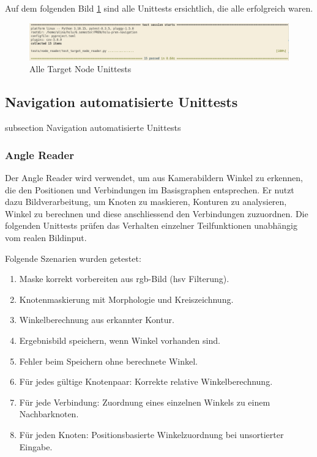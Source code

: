 \begin{table}[H]
\begin{tabularx}
  \hline
\end{tabularx}
\caption{Target Node Recognition Testprotokoll}
\label{table:target-node-test}
\end{table}



Auf dem folgenden Bild \ref{img:target_node_unittests} sind alle Unittests ersichtlich, die alle erfolgreich waren.

\begin{figure}[H]
\centering
\includegraphics[width=\textwidth]{assets/IT/testing/target_node/target_node_reader_unittests.png}
\caption{Alle Target Node Unittests}
\label{img:target_node_unittests}
\end{figure}

\newpage
\subsection*{Navigation automatisierte Unittests}\label{nav-unittests}
    {subsection}
    {Navigation automatisierte Unittests}

\subsubsection*{Angle Reader}\label{angle-reader-unittests}

Der Angle Reader wird verwendet, um aus Kamerabildern Winkel zu erkennen, die den Positionen und Verbindungen im Basisgraphen entsprechen. Er nutzt dazu Bildverarbeitung, um Knoten zu maskieren, Konturen zu analysieren, Winkel zu berechnen und diese anschliessend den Verbindungen zuzuordnen. Die folgenden Unittests prüfen das Verhalten einzelner Teilfunktionen unabhängig vom realen Bildinput.

Folgende Szenarien wurden getestet:

\begin{enumerate}
\item Maske korrekt vorbereiten aus \acrshort{rgb}-Bild (\acrfull{hsv} Filterung).
\item Knotenmaskierung mit Morphologie und Kreiszeichnung.
\item Winkelberechnung aus erkannter Kontur.
\item Ergebnisbild speichern, wenn Winkel vorhanden sind.
\item Fehler beim Speichern ohne berechnete Winkel.
\item Für jedes gültige Knotenpaar: Korrekte relative Winkelberechnung.
\item Für jede Verbindung: Zuordnung eines einzelnen Winkels zu einem Nachbarknoten.
\item Für jeden Knoten: Positionsbasierte Winkelzuordnung bei unsortierter Eingabe.
\end{enumerate}

